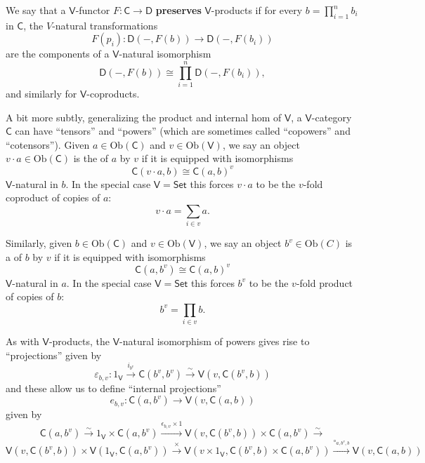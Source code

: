 \documentclass{amsart}
\newcommand{\define}[1]{{\bf \boldmath{#1}}}
\theoremstyle{definition}
\newcommand{\Set}{\mathsf{Set}}
\newcommand{\V}{\mathsf{V}}
\newcommand{\D}{\mathsf{D}}
\newcommand{\C}{\mathsf{C}}
\newcommand{\op}{\mathrm{op}}
\newcommand{\Obj}{\mathrm{Ob}}
\newcommand{\maps}{\colon}
\begin{document}
We say that a $\V$-functor $F\maps \C\to \D$ \textbf{preserves} $\V$-products if for every $b = \prod_{i=1}^n b_i$ in $\C$, the $V$-natural transformations
\[     F(p_i) \maps \D(-,F(b)) \to \D(-,F(b_i))   \]
are the components of a $\V$-natural isomorphism 
\[           \D(-,F(b)) \cong \prod_{i=1}^n \D(-,F(b_i)), \]
and similarly for $\V$-coproducts. 

A bit more subtly, generalizing the product and internal hom of $\V$, a $\V$-category $\C$ can
have ``tensors'' and ``powers'' (which are sometimes called ``copowers'' and ``cotensors'').
Given $a \in \Obj(\C)$ and $v \in \Obj(\V)$, we say an object $v \cdot a \in \Obj(\C)$ is the \define{tensor} of $a$ by $v$ if it is equipped with isomorphisms
\[
	\C(v\cdot a,b) \cong  \C(a,b)^v
\]
$\V$-natural in $b$.
In the special case $\V = \Set$ this forces $v \cdot a$ to be the $v$-fold coproduct 
of copies of $a$:
\[       v \cdot a = \sum_{i \in v} a . \]
\iffalse
In general, if we can choose a tensor product $v \cdot a$ for all $v \in \V$, $a \in \C$
we say $\C$ is \textbf{$\V$-tensored}, and we obtain a $\V$-functor
\[
\begin{array}{ccl}
  \underline{\V} \times \C  &\to& \C \\
 (v,a) &\mapsto & v \cdot a. \\
\end{array}
\]
For example, $\underline{\V}$ is always $\V$-tensored via the cartesian product
$ \times \maps \underline{\V} \times \underline{\V} \to \underline{\V} $.
\fi
Similarly, given $b \in \Obj(\C)$ and $v \in \Obj(\V)$, we say an object $b^v \in \Obj(C)$ is a \define{power} of $b$ by $v$ if it is equipped with isomorphisms
\[
		 \C(a,b^v) \cong \C(a,b)^v
\]
$\V$-natural in $a$.  
In the special case $\V = \Set$  this forces $b^v$ to be the $v$-fold product of copies of $b$:
\[          b^v = \prod_{i \in v} b . \]
\iffalse
In general, if we can choose a power $b^v$ for all $b \in C$, $v \in \V$,
we say $\C$ is \textbf{$\V$-powered}, and we obtain a $\V$-functor
\[
\begin{array}{ccl}
 \C \times \underline{\V}^\op  &\to& \C \\
 (b, v) &\mapsto & b^v .\\
\end{array}
\]
\fi


 As with $\V$-products, the $\V$-natural isomorphism of powers gives rise to ``projections'' given by
 \[\varepsilon_{b,v}\maps 1_\V \stackrel{i_{b^v}}{\longrightarrow}  \C(b^v,b^v) \stackrel{\sim}{\longrightarrow} \V(v,\C(b^v,b))\]
 and these allow us to define ``internal projections'' 
 \[ e_{b,v}\maps \C(a,b^v) \to \V(v,\C(a,b)) \]
 given  by
 \[\C(a,b^v) \stackrel{\sim}{\longrightarrow} 1_\V \times \C(a,b^v)  \stackrel{\epsilon_{b,v} \times 1}{\longrightarrow} \V(v,\C(b^v,b))\times \C(a,b^v) \stackrel{\sim}{\longrightarrow} \]\[ \V(v,\C(b^v,b))\times \V(1_\V,\C(a,b^v)) \stackrel{\times}{\longrightarrow} \V(v\times 1_\V, \C(b^v,b)\times \C(a,b^v)) \stackrel{\circ_{a,b^v,b}}{\longrightarrow} \V(v,\C(a,b)) \]
\end{document}
